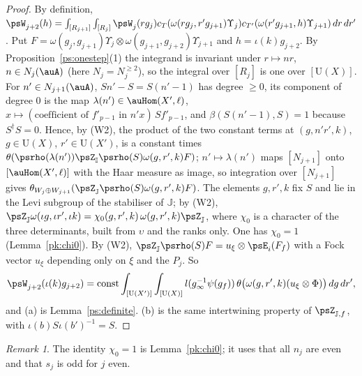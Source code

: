 \documentclass[10pt]{amsart}
\theoremstyle{definition}
\theoremstyle{remark}
\newtheorem{remark}[theorem]{Remark}
\providecommand{\auU}{\mathrm U}
\begin{document}
\begin{proof}
By definition, $\psW_{j+2}(h)=\int_{[R_{j+1}]}\int_{[R_j]}\psW_j(rg_j)c_T(\omega(rg_j,r'g_{j+1})
\Upsilon_j)c_{T'}(\omega(r'g_{j+1},h)\Upsilon_{j+1})\,dr\,dr'$. Put $F=\omega(g_j,g_{j+1})\Upsilon_j
\otimes\omega(g_{j+1},g_{j+2})\Upsilon_{j+1}$ and $h=\iota(k)g_{j+2}$. By
Proposition~\ref{ps:onestep}(1) the integrand is invariant under $r\mapsto nr$, $n\in N_j(\auA)$
(here $N_j=N_j^{\ge2}$), so the integral over $[R_j]$ is one over $[\auU(X)]$. For $n'\in
N_{j+1}(\auA)$, $Sn'-S=S(n'-1)$ has degree $\ge0$, its component of degree $0$ is the map
$\lambda(n')\in\auHom(X',\ell)$, $x\mapsto(\text{coefficient of }f'_{p-1}\text{ in }n'x)\,Sf'_{p-1}$,
and $\beta(S(n'-1),S)=1$ because $S^\dagger S=0$. Hence, by (W2), the product of the two constant
terms at $(g,n'r',k)$, $g\in\auU(X)$, $r'\in\auU(X')$, is a constant times $\theta(\psrho(\lambda
(n'))\psZ_{\mathbb I}\psrho(S)\omega(g,r',k)F)$; $n'\mapsto\lambda(n')$ maps $[N_{j+1}]$ onto
$[\auHom(X',\ell)]$ with the Haar measure as image, so integration over $[N_{j+1}]$ gives
$\theta_{W_j\oplus W_{j+1}}(\psZ_{\mathbb J}\psrho(S)\omega(g,r',k)F)$. The elements $g,r',k$ fix $S$
and lie in the Levi subgroup of the stabiliser of $\mathbb J$; by (W2), $\psZ_{\mathbb J}\omega(\iota
g,\iota r',\iota k)=\chi_0(g,r',k)\,\omega(g,r',k)\psZ_{\mathbb J}$, where $\chi_0$ is a character of
the three determinants, built from $\upsilon$ and the ranks only. One has $\chi_0=1$ (Lemma~\ref{pk:chi0}). By (W2), $\psZ_{\mathbb J}
\psrho(S)F=u_\xi\otimes\psE_i(F_f)$ with a Fock vector $u_\xi$ depending only on $\xi$ and the
$P_j$. So
\[
\psW_{j+2}(\iota(k)g_{j+2})=\mathrm{const}\int_{[\auU(X')]}\int_{[\auU(X)]}l(g_\infty^{-1}\psi(g_f))\,
\theta\bigl(\omega(g,r',k)(u_\xi\otimes\Phi)\bigr)\,dg\,dr',
\]
and (a) is Lemma~\ref{ps:definite}. (b) is the same intertwining property of $\psZ_{\mathbb J,f}$,
with $\iota(b)S\iota(b')^{-1}=S$.
\end{proof}

\begin{remark}\label{ps:chi0}
The identity $\chi_0=1$ is Lemma~\ref{pk:chi0}; it uses that all $n_j$ are even and that $s_j$ is
odd for $j$ even.
\end{remark}
\end{document}
